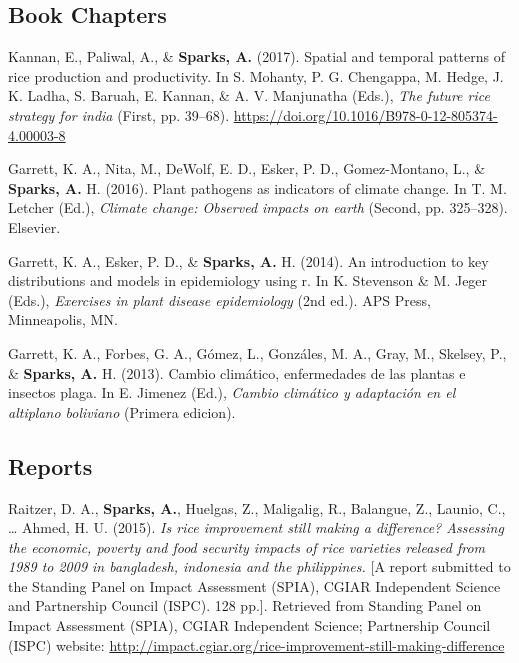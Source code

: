 \documentclass[11pt, a4paper]{awesome-cv}
\begin{document}
\endgroup

\hypertarget{book-chapters}{%
\subsection{Book Chapters}\label{book-chapters}}

\begingroup
\setlength{\parindent}{-0.5in}
\setlength{\leftskip}{0.5in}

\hypertarget{refs_books}{}
\leavevmode\hypertarget{ref-Kannan2017}{}%
Kannan, E., Paliwal, A., \& \textbf{Sparks, A.} (2017). Spatial and temporal patterns of rice production and productivity. In S. Mohanty, P. G. Chengappa, M. Hedge, J. K. Ladha, S. Baruah, E. Kannan, \& A. V. Manjunatha (Eds.), \emph{The future rice strategy for india} (First, pp. 39--68). \url{https://doi.org/10.1016/B978-0-12-805374-4.00003-8}

\leavevmode\hypertarget{ref-Garrett2016}{}%
Garrett, K. A., Nita, M., DeWolf, E. D., Esker, P. D., Gomez-Montano, L., \& \textbf{Sparks, A.} H. (2016). Plant pathogens as indicators of climate change. In T. M. Letcher (Ed.), \emph{Climate change: Observed impacts on earth} (Second, pp. 325--328). Elsevier.

\leavevmode\hypertarget{ref-Garrett2014}{}%
Garrett, K. A., Esker, P. D., \& \textbf{Sparks, A.} H. (2014). An introduction to key distributions and models in epidemiology using r. In K. Stevenson \& M. Jeger (Eds.), \emph{Exercises in plant disease epidemiology} (2nd ed.). APS Press, Minneapolis, MN.

\leavevmode\hypertarget{ref-Garrett2013}{}%
Garrett, K. A., Forbes, G. A., Gómez, L., Gonzáles, M. A., Gray, M., Skelsey, P., \& \textbf{Sparks, A.} H. (2013). Cambio climático, enfermedades de las plantas e insectos plaga. In E. Jimenez (Ed.), \emph{Cambio climático y adaptación en el altiplano boliviano} (Primera edicion).

\endgroup

\hypertarget{reports}{%
\subsection{Reports}\label{reports}}

\begingroup
\setlength{\parindent}{-0.5in}
\setlength{\leftskip}{0.5in}

\hypertarget{refs_reports}{}
\leavevmode\hypertarget{ref-Raitzer2015}{}%
Raitzer, D. A., \textbf{Sparks, A.}, Huelgas, Z., Maligalig, R., Balangue, Z., Launio, C., \ldots{} Ahmed, H. U. (2015). \emph{Is rice improvement still making a difference? Assessing the economic, poverty and food security impacts of rice varieties released from 1989 to 2009 in bangladesh, indonesia and the philippines.} {[}A report submitted to the Standing Panel on Impact Assessment (SPIA), CGIAR Independent Science and Partnership Council (ISPC). 128 pp.{]}. Retrieved from Standing Panel on Impact Assessment (SPIA), CGIAR Independent Science; Partnership Council (ISPC) website: \url{http://impact.cgiar.org/rice-improvement-still-making-difference}
\end{document}
